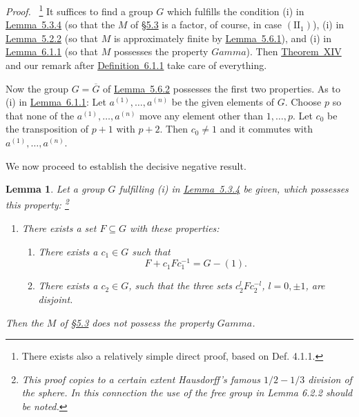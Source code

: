 \documentclass[b5paper,twoside]{article}
\newcommand{\secref}[2]{\hyperref[#1]{\mbox{\S#2}}}
\newcommand{\thmref}[2]{\hyperref[#1]{\mbox{Theorem~#2}}}
\newcommand{\lemref}[2]{\hyperref[#1]{\mbox{Lemma~#2}}}
\newcommand{\defref}[2]{\hyperref[#1]{\mbox{Definition~#2}}}
\theoremstyle{mvnplain}
\newtheorem{lemma}{Lemma}[section]
\renewenvironment{proof}[1][Proof]{%
  \par\addvspace{0.35\baselineskip}%
  \noindent\textit{#1.}\ \normalfont\ignorespaces
}{%
  \par\addvspace{0.35\baselineskip}%
}
\newcommand{\M}{\mathbf M}
\def\M{M}%
\def\Gamma{Gamma}%
\def\mathfrak#1{#1}%
\begin{document}
\begin{proof}\footnote{There exists also a relatively simple direct proof,
based on Def. 4.1.1.}
It suffices to find a group $\mathfrak G$ which fulfills the condition (i) in
\lemref{lem:5.3.4}{5.3.4} (so that the $\M$ of \secref{sec:5.3}{5.3} is a
factor, of course, in case $(\mathrm{II}_1)$), (i) in
\lemref{lem:5.2.2}{5.2.2} (so that $\M$ is approximately finite by
\lemref{lem:5.6.1}{5.6.1}), and (i) in \lemref{lem:6.1.1}{6.1.1} (so that
$\M$ possesses the property $\Gamma$). Then \thmref{thm:XIV}{XIV} and our
remark after \defref{def:6.1.1}{6.1.1} take care of everything.

Now the group $\mathfrak G=\overline{\mathfrak G}$ of
\lemref{lem:5.6.2}{5.6.2} possesses the first two properties. As to (i) in
\lemref{lem:6.1.1}{6.1.1}: Let $a^{(1)},\ldots,a^{(n)}$ be the given
elements of $\mathfrak G$. Choose $p$ so that none of the
$a^{(1)},\ldots,a^{(n)}$ move any element other than $1,\ldots,p$. Let $c_0$
be the transposition of $p+1$ with $p+2$. Then $c_0\ne1$ and it commutes with
$a^{(1)},\ldots,a^{(n)}$.
\end{proof}

We now proceed to establish the decisive negative result.

\begin{lemma}\label{lem:6.2.1}
Let a group $\mathfrak G$ fulfilling (i) in \lemref{lem:5.3.4}{5.3.4} be
given, which possesses this property:
\footnote{This proof copies to a certain
extent Hausdorff's famous $1/2-1/3$ division of the sphere. In this connection
the use of the free group in Lemma 6.2.2 should be noted.}

\begin{enumerate}[label=(i),leftmargin=3em]
\item There exists a set $\mathfrak F\subseteq\mathfrak G$ with these
properties:
  \begin{enumerate}[label=(i\textsubscript{\arabic*}),leftmargin=3em]
  \item There exists a $c_1\in\mathfrak G$ such that
  \[
    \mathfrak F+c_1\mathfrak F c_1^{-1}=\mathfrak G-(1).
  \]
  \item There exists a $c_2\in\mathfrak G$, such that the three sets
  $c_2^l\mathfrak F c_2^{-l}$, $l=0,\pm1$, are disjoint.
  \end{enumerate}
\end{enumerate}
Then the $\M$ of \secref{sec:5.3}{5.3} does not possess the property $\Gamma$.
\end{lemma}
\end{document}

